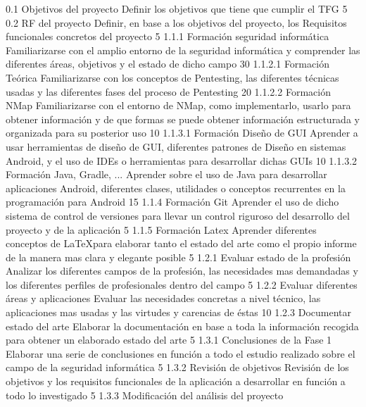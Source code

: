 \taskframe
	{0.1}
	{Objetivos del proyecto}
	{Definir los objetivos que tiene que cumplir el TFG}
	{5}
\taskframe
	{0.2}
	{RF del proyecto}
	{Definir, en base a los objetivos del proyecto, los Requisitos funcionales concretos del proyecto}
	{5}
\taskframe
	{1.1.1}
	{Formación seguridad informática}
	{Familiarizarse con el amplio entorno de la seguridad informática y comprender las diferentes áreas, objetivos y el estado de dicho campo}
	{30}
\taskframe
	{1.1.2.1}
	{Formación Teórica}
	{Familiarizarse con los conceptos de Pentesting, las diferentes técnicas usadas y las diferentes fases del proceso de Pentesting}
	{20}
\taskframe
	{1.1.2.2}
	{Formación NMap}
	{Familiarizarse con el entorno de NMap, como implementarlo, usarlo para obtener información y de que formas se puede obtener información estructurada y organizada para su posterior uso}
	{10}
\taskframe
	{1.1.3.1}
	{Formación Diseño de GUI}
	{Aprender a usar herramientas de diseño de GUI, diferentes patrones de Diseño en sistemas Android, y el uso de IDEs o herramientas para desarrollar dichas GUIs}
	{10}
\taskframe
	{1.1.3.2}
	{Formación Java, Gradle, ...}
	{Aprender sobre el uso de Java para desarrollar aplicaciones Android, diferentes clases, utilidades o conceptos recurrentes en la programación para Android}
	{15}
\taskframe
	{1.1.4}
	{Formación Git}
	{Aprender el uso de dicho sistema de control de versiones para llevar un control riguroso del desarrollo del proyecto y de la aplicación}
	{5}
\taskframe
	{1.1.5}
	{Formación Latex}
	{Aprender diferentes conceptos de \LaTeX para elaborar tanto el estado del arte como el propio informe de la manera mas clara y elegante posible}
	{5}
\taskframe
	{1.2.1}
	{Evaluar estado de la profesión}
	{Analizar los diferentes campos de la profesión, las necesidades mas demandadas y los diferentes perfiles de profesionales dentro del campo}
	{5}
\taskframe
	{1.2.2}
	{Evaluar diferentes áreas y aplicaciones}
	{Evaluar las necesidades concretas a nivel técnico, las aplicaciones mas usadas y las virtudes y carencias de éstas}
	{10}
\taskframe
	{1.2.3}
	{Documentar estado del arte}
	{Elaborar la documentación en base a toda la información recogida para obtener un elaborado estado del arte}
	{5}
\taskframe
	{1.3.1}
	{Conclusiones de la Fase 1}
	{Elaborar una serie de conclusiones en función a todo el estudio realizado sobre el campo de la seguridad informática}
	{5}
\taskframe
	{1.3.2}
	{Revisión de objetivos}
	{Revisión de los objetivos y los requisitos funcionales de la aplicación a desarrollar en función a todo lo investigado}
	{5}
\taskframe
	{1.3.3}
	{Modificación del análisis del proyecto}
